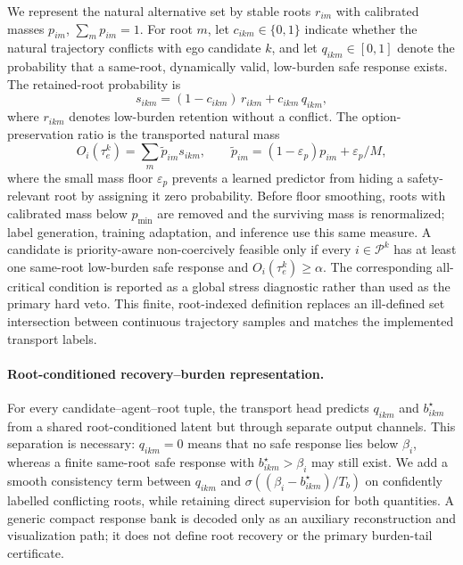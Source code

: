 \documentclass[10pt]{article}
\begin{document}
We represent the natural alternative set by stable roots $r_{im}$ with calibrated masses $p_{im}$, $\sum_m p_{im}=1$. For root $m$, let $c_{ikm}\in\{0,1\}$ indicate whether the natural trajectory conflicts with ego candidate $k$, and let $q_{ikm}\in[0,1]$ denote the probability that a same-root, dynamically valid, low-burden safe response exists. The retained-root probability is
\begin{equation}
    s_{ikm}=(1-c_{ikm})\,r_{ikm}+c_{ikm}\,q_{ikm},
\end{equation}
where $r_{ikm}$ denotes low-burden retention without a conflict. The option-preservation ratio is the transported natural mass
\begin{equation}
    O_i(\tau^k_e)=\sum_m \widetilde p_{im}s_{ikm},
    \qquad
    \widetilde p_{im}=(1-\varepsilon_p)p_{im}+\varepsilon_p/M,
    \label{eq:option_preservation}
\end{equation}
where the small mass floor $\varepsilon_p$ prevents a learned predictor from hiding a safety-relevant root by assigning it zero probability. Before floor smoothing, roots with calibrated mass below $p_{\min}$ are removed and the surviving mass is renormalized; label generation, training adaptation, and inference use this same measure. A candidate is priority-aware non-coercively feasible only if every $i\in\mathcal{P}^k$ has at least one same-root low-burden safe response and $O_i(\tau^k_e)\ge\alpha$. The corresponding all-critical condition is reported as a global stress diagnostic rather than used as the primary hard veto. This finite, root-indexed definition replaces an ill-defined set intersection between continuous trajectory samples and matches the implemented transport labels.

\paragraph{Root-conditioned recovery--burden representation.}
For every candidate--agent--root tuple, the transport head predicts $q_{ikm}$ and $b^\star_{ikm}$ from a shared root-conditioned latent but through separate output channels.  This separation is necessary: $q_{ikm}=0$ means that no safe response lies below $\beta_i$, whereas a finite same-root safe response with $b^\star_{ikm}>\beta_i$ may still exist.  We add a smooth consistency term between $q_{ikm}$ and $\sigma((\beta_i-b^\star_{ikm})/T_b)$ on confidently labelled conflicting roots, while retaining direct supervision for both quantities.  A generic compact response bank is decoded only as an auxiliary reconstruction and visualization path; it does not define root recovery or the primary burden-tail certificate.
\end{document}
